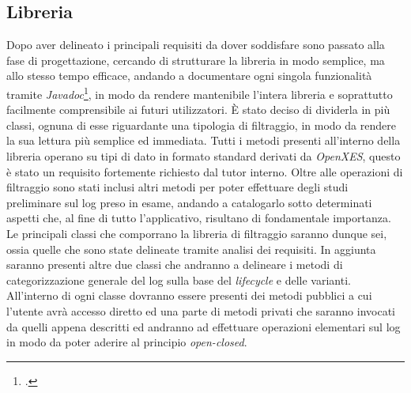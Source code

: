 \subsection{Libreria}
Dopo aver delineato i principali requisiti da dover soddisfare sono passato alla fase di progettazione, cercando di strutturare la libreria in modo semplice, ma allo stesso tempo efficace, andando a documentare ogni singola funzionalità tramite \textit{\gls{Javadoc}}\footcite{Javadoc: https://docs.oracle.com/javase/8/docs/technotes/tools/windows/javadoc.html}, in modo da rendere mantenibile l'intera libreria e soprattutto facilmente comprensibile ai futuri utilizzatori. È stato deciso di dividerla in più classi, ognuna di esse riguardante una tipologia di filtraggio, in modo da rendere la sua lettura più semplice ed immediata. Tutti i metodi presenti all'interno della libreria operano su tipi di dato in formato standard derivati da \textit{OpenXES}, questo è stato un requisito fortemente richiesto dal tutor interno. Oltre alle operazioni di filtraggio sono stati inclusi altri metodi per poter effettuare degli studi preliminare sul log preso in esame, andando a catalogarlo sotto determinati aspetti che, al fine di tutto l'applicativo, risultano di fondamentale importanza. Le principali classi che comporrano la libreria di filtraggio saranno dunque sei, ossia quelle che sono state delineate tramite analisi dei requisiti.
In aggiunta saranno presenti altre due classi che andranno a delineare i metodi di categorizzazione generale del log sulla base del \textit{lifecycle} e delle varianti. All'interno di ogni classe dovranno essere presenti dei metodi pubblici a cui l'utente avrà accesso diretto ed una parte di metodi privati che saranno invocati da quelli appena descritti ed andranno ad effettuare operazioni elementari sul log in modo da poter aderire al principio \textit{\gls{open-closed}}.
